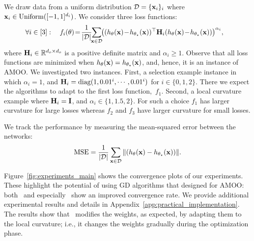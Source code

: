 We draw data from a uniform distribution $\mathcal{D}=\{ {\mathbf{x}}_i \}_{i}$ where ${\mathbf{x}}_i\in \mathrm{Uniform}([-1,1]^{d_i})$. We consider three loss functions:
\begin{align*}
    &\forall i \in [3]: \quad f_i(\theta) \!=\! \frac{1}{|\mathcal{D}|}\!\!\sum_{\x\in \mathcal{D}}\!\!\brac{(h_\theta(\x)\! -\! h_{\theta_\star}(\x))^\top \H_i (h_\theta(\x)\! -\! h_{\theta_\star}(\x))}^{\alpha_i}\!,
\end{align*}
where ${\mathbf{H}}_i\in \mathbb{R}^{d_o\times d_o}$  is a positive definite matrix and $\alpha_i\geq 1$. Observe that all loss functions are minimized when $h_\theta({\mathbf{x}})=h_{\theta_\star}({\mathbf{x}})$, and, hence, it is an instance of AMOO. We investigated two instances. First, a selection example instance in which $\alpha_i=1$, and ${\mathbf{H}}_i= \mathrm{diag}(1, 0.01^i,\cdots,0.01^{i})$ for $i\in \{0,1,2\}$. There we expect the algorithms to adapt to the first loss function,~$f_1$. Second, a local curvature example where  ${\mathbf{H}}_i={\mathbf{I}}$, and $\alpha_i\in \{1,1.5,2\}.$ For such a choice $f_1$ has larger curvature for large losses whereas $f_2$ and $f_3$ have larger curvature  for small losses. 

We track the performance by measuring the mean-squared error between the networks:
$$
    {\mathrm{MSE}=\frac{1}{|\mathcal{D}|} \sum_{{\mathbf{x}}\in \mathcal{D}} \left\Vert(h_\theta({\mathbf{x}}) - h_{\theta_\star}({\mathbf{x}}))\right\Vert}.
$$

Figure~\ref{fig:experiments_main} shows the convergence plots of our experiments. These highlight the potential of using GD algorithms that designed for AMOO: both \CAMOO\ and especially \PAMOO\ show an improved convergence rate. We provide additional experimental results and details in Appendix~\ref{app:practical_implementation}. The results show that \CAMOO\ modifies the weights, as expected, by adapting them to the local curvature; i.e., it changes the weights gradually during the optimization phase.




